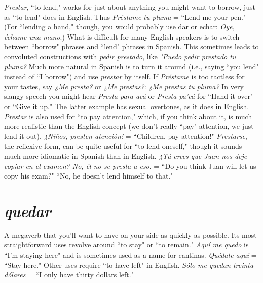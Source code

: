 \emph{Prestar}, ``to lend," works for just about anything you might
want to borrow, just as ``to lend" does in English. Thus \emph{Préstame tu
	pluma} = ``Lend me your pen." (For ``lending a hand," though, you
would probably use dar or echar: \emph{Oye, échame una mano}.) What is
difficult for many English speakers is to switch between ``borrow"
phrases and ``lend" phrases in Spanish. This sometimes leads to convoluted constructions with \emph{pedir prestado}, like \emph{"Puedo pedir prestado tu
	pluma?} Much more natural in Spanish is to turn it around (i.e., saying
``you lend" instead of ``I borrow") and use \emph{prestar} by itself. If \emph{Préstame}
is too tactless for your tastes, say \emph{¿Me presta?} or \emph{¿Me prestas?}: \emph{¿Me
	prestas tu pluma?} In very slangy speech you might hear \emph{Presta para
	acá} or \emph{Presta pa'cá} for ``Hand it over" or ``Give it up." The latter example has sexual overtones, as it does in English.
\emph{Prestar} is also used for ``to pay attention," which, if you think
about it, is much more realistic than the English concept (we don't really ``pay" attention, we just lend it out). \emph{¿Niños, presten atención!} =
``Children, pay attention!" \emph{Prestarse}, the reflexive form, can be quite
useful for ``to lend oneself," though it sounds much more idiomatic in
Spanish than in English. \emph{¿Tú crees que Juan nos deje copiar en el examen? No, él no se presta a eso}. = ``Do you think Juan will let us copy
his exam?" ``No, he doesn't lend himself to that."

\section{\emph{quedar}}

A megaverb that you'll want to have on your side as quickly as
possible. Its most straightforward uses revolve around ``to stay" or ``to
remain." \emph{Aquí me quedo} is ``I'm staying here" and is sometimes used
as a name for cantinas. \emph{Quédate aquí} = ``Stay here." Other uses
require ``to have left" in English. \emph{Sólo me quedan treinta dólares} = ``I
only have thirty dollars left."

